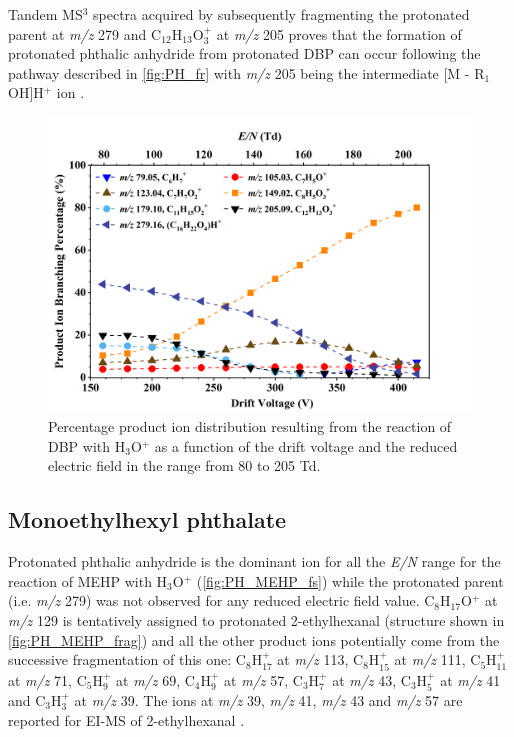 Tandem MS$^3$ spectra acquired by subsequently fragmenting the protonated parent at \textit{m/z} 279 and C$_{12}$H$_{13}$O$_3^+$ at \textit{m/z} 205 proves that the formation of protonated phthalic anhydride from protonated DBP can occur following the pathway described in \autoref{fig:PH_fr} with \textit{m/z} 205 being the intermediate [M - R$_1$OH]H$^+$ ion \cite{mzcloudDBP}.
%



\begin{figure}[htb]%
\centering
\includegraphics[height=0.35\textheight]{pics/DBP-BR.png}
\caption{Percentage product ion distribution resulting from the reaction of DBP with H$_3$O$^+$ as a function of the drift voltage and the reduced electric field in the range from 80 to 205 Td.}
\label{fig:PH_DBP_fs}
\end{figure}



\subsection{Monoethylhexyl phthalate}




Protonated phthalic anhydride is the dominant ion for all the \textit{E/N} range for the reaction of MEHP with H$_3$O$^+$ (\autoref{fig:PH_MEHP_fs}) while the protonated parent (i.e. \textit{m/z} 279) was not observed for any reduced electric field value.
%
C$_8$H$_{17}$O$^+$ at \textit{m/z} 129 is tentatively assigned to protonated 2-ethylhexanal (structure shown in \autoref{fig:PH_MEHP_frag}) and all the other product ions potentially come from the successive fragmentation of this one:
C$_8$H$_{17}^+$ at \textit{m/z} 113,
C$_8$H$_{15}^+$ at \textit{m/z} 111,
C$_5$H$_{11}^+$ at \textit{m/z} 71,
C$_5$H$_9^+$ at \textit{m/z} 69,
C$_4$H$_9^+$ at \textit{m/z} 57,
C$_3$H$_7^+$ at \textit{m/z} 43,
C$_3$H$_5^+$ at \textit{m/z} 41
and
C$_3$H$_3^+$ at \textit{m/z} 39.
%
The ions at \textit{m/z} 39, \textit{m/z} 41, \textit{m/z} 43 and \textit{m/z} 57 are reported for EI-MS of  2-ethylhexanal \cite{nist2hexanal}.

